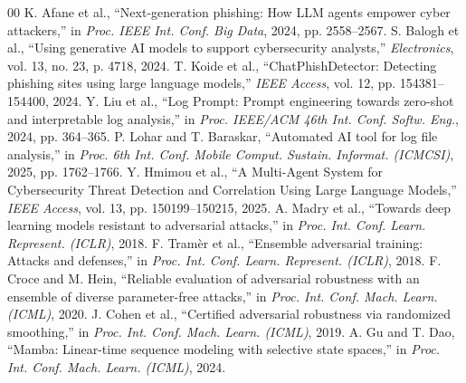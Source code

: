 \documentclass[journal,twoside]{IEEEtran}
\begin{document}
\begin{thebibliography}{00}
 K. Afane et al., ``Next-generation phishing: How LLM agents empower cyber attackers,'' in \textit{Proc. IEEE Int. Conf. Big Data}, 2024, pp. 2558--2567.
 S. Balogh et al., ``Using generative AI models to support cybersecurity analysts,'' \textit{Electronics}, vol. 13, no. 23, p. 4718, 2024.
 T. Koide et al., ``ChatPhishDetector: Detecting phishing sites using large language models,'' \textit{IEEE Access}, vol. 12, pp. 154381--154400, 2024.
 Y. Liu et al., ``Log Prompt: Prompt engineering towards zero-shot and interpretable log analysis,'' in \textit{Proc. IEEE/ACM 46th Int. Conf. Softw. Eng.}, 2024, pp. 364--365.
 P. Lohar and T. Baraskar, ``Automated AI tool for log file analysis,'' in \textit{Proc. 6th Int. Conf. Mobile Comput. Sustain. Informat. (ICMCSI)}, 2025, pp. 1762--1766.
 Y. Hmimou et al., ``A Multi-Agent System for Cybersecurity Threat Detection and Correlation Using Large Language Models,'' \textit{IEEE Access}, vol. 13, pp. 150199--150215, 2025.
 A. Madry et al., ``Towards deep learning models resistant to adversarial attacks,'' in \textit{Proc. Int. Conf. Learn. Represent. (ICLR)}, 2018.
 F. Tramèr et al., ``Ensemble adversarial training: Attacks and defenses,'' in \textit{Proc. Int. Conf. Learn. Represent. (ICLR)}, 2018.
 F. Croce and M. Hein, ``Reliable evaluation of adversarial robustness with an ensemble of diverse parameter-free attacks,'' in \textit{Proc. Int. Conf. Mach. Learn. (ICML)}, 2020.
 J. Cohen et al., ``Certified adversarial robustness via randomized smoothing,'' in \textit{Proc. Int. Conf. Mach. Learn. (ICML)}, 2019.
 A. Gu and T. Dao, ``Mamba: Linear-time sequence modeling with selective state spaces,'' in \textit{Proc. Int. Conf. Mach. Learn. (ICML)}, 2024.
\end{thebibliography}
\end{document}
